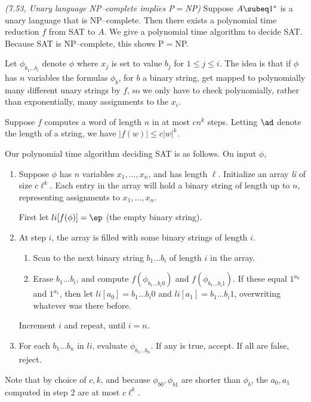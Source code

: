 \begin{problem}{\it(7.53, Unary language NP--complete implies P$=$NP)}
Suppose $A\subeq 1^*$ is a unary language that is NP--complete. Then there exists a polynomial time reduction $f$ from SAT to $A$. We give a polynomial time algorithm to decide SAT. Because SAT is NP--complete, this shows P$=$NP.

Let $\phi_{b_1\ldots b_i}$ denote $\phi$ where $x_j$ is set to value $b_j$ for $1\le j\le i$. The idea is that if $\phi$ has $n$ variables the formulas $\phi_{b}$, for $b$ a binary string, get mapped to polynomially many different unary strings by $f$, so we only have to check polynomially, rather than exponentially, many assignments to the $x_i$.

Suppose $f$ computes a word of length $n$ in at most $cn^k$ steps. Letting $\ad$ denote the length of a string, we have $|f(w)|\le c|w|^k$.

Our polynomial time algorithm deciding SAT is as follows. On input $\phi$,
\begin{enumerate}
\item Suppose $\phi$ has $n$ variables $x_1,\ldots, x_n$, and has length $\ell$. Initialize an array {\it li} of size $c\ell^k$. Each entry in the array will hold a binary string of length up to $n$, representing assignments to $x_1,\ldots, x_n$. 

First let $li[f(\phi)] =\ep$ (the empty binary string). %

\item At step $i$, the array is filled with some binary strings of length $i$. 

\begin{enumerate}
\item
Scan to the next binary string $b_1\ldots b_i$  of length $i$ in the array. %
\item
Erase $b_1\ldots b_i$, and compute $f(\phi_{b_1\ldots b_i0})$ and $f(\phi_{b_1\ldots b_i1})$. If these equal $1^{a_0}$ and $1^{a_1}$, then let $li[a_0]=b_1\ldots b_i0$ and $li[a_1]=b_1\ldots b_i1$, overwriting whatever was there before.
\end{enumerate}
Increment $i$ and repeat, until $i=n$.
\item
For each $b_1\ldots b_n$ in $li$, evaluate $\phi_{b_1\ldots b_n}$. If any is true, accept. If all are false,  reject.
\end{enumerate}
Note that by choice of $c,k$, and because $\phi_{b0},\phi_{b1}$ are shorter than $\phi_b$, the $a_0,a_1$ computed in step 2 are at most $c\ell^k$.


\end{problem}

